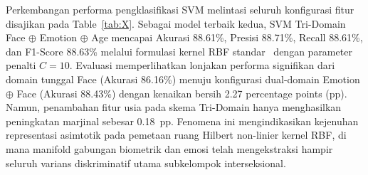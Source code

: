 Perkembangan performa pengklasifikasi SVM melintasi seluruh konfigurasi fitur disajikan pada Table~\ref{tab:X}. Sebagai model terbaik kedua, SVM Tri-Domain Face $\oplus$ Emotion $\oplus$ Age mencapai Akurasi 88.61\%, Presisi 88.71\%, Recall 88.61\%, dan F1-Score 88.63\% melalui formulasi kernel RBF standar~\cite{ref51} dengan parameter penalti $C = 10$. Evaluasi memperlihatkan lonjakan performa signifikan dari domain tunggal Face (Akurasi 86.16\%) menuju konfigurasi dual-domain Emotion $\oplus$ Face (Akurasi 88.43\%) dengan kenaikan bersih 2.27 percentage points (pp). Namun, penambahan fitur usia pada skema Tri-Domain hanya menghasilkan peningkatan marjinal sebesar 0.18~pp. Fenomena ini mengindikasikan kejenuhan representasi asimtotik pada pemetaan ruang Hilbert non-linier kernel RBF, di mana manifold gabungan biometrik dan emosi telah mengekstraksi hampir seluruh varians diskriminatif utama subkelompok interseksional.


